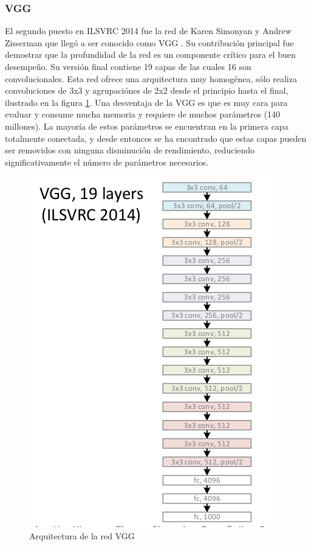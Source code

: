 \documentclass[a4paper,11pt,spanish]{book}
\begin{document}
	\subsubsection{VGG}
	  El segundo puesto en ILSVRC 2014 fue la red de Karen Simonyan y Andrew Zisserman que llegó a ser conocido como VGG \cite{SimonyanVGG}. 
	  Su contribución principal fue demostrar que la profundidad de
	  la red es un componente crítico para el buen desempeño. Su versión final contiene 19 capas de las cuales 16 son convolucionales. Esta red ofrece una arquitectura 
	  muy homogénea, sólo realiza convoluciones de 3x3 y agrupaciónes de 2x2 desde el principio hasta el final, ilustrado en la figura \ref{fig:vgg}.
	  Una desventaja de la VGG es que es muy cara para evaluar y consume mucha memoria y requiere de muchos parámetros (140 millones). 
	  La mayoría de estos parámetros se encuentran en la primera
	  capa totalmente conectada, y desde entonces se ha encontrado que estas capas pueden ser removidos con ninguna disminución de rendimiento, reduciendo significativamente el
	  número de parámetros necesarios.
	  
	  \begin{figure}[h]
	    \begin{center}
	    \includegraphics[width=0.6\linewidth]{./img/vgg-19.png}
	    \end{center}
	    \caption{Arquitectura de la red VGG}
	    \label{fig:vgg}
	  \end{figure}	
\end{document}
